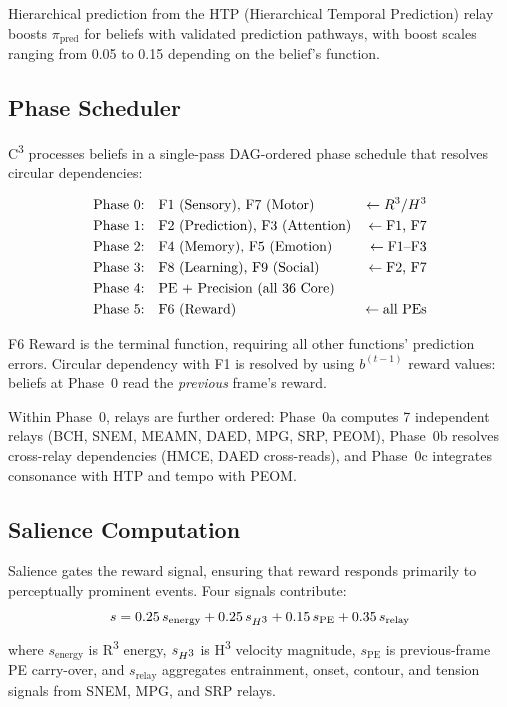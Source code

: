 \documentclass[10pt,twocolumn]{article}
\newcommand{\Rcube}{R\textsuperscript{3}}
\newcommand{\Hcube}{H\textsuperscript{3}}
\newcommand{\Ccube}{C\textsuperscript{3}}
\newcommand{\pe}{\mathrm{PE}}
\newcommand{\pipred}{\pi_{\mathrm{pred}}}
\begin{document}
Hierarchical prediction from the HTP (Hierarchical Temporal Prediction) relay boosts $\pipred$ for beliefs with validated prediction pathways, with boost scales ranging from 0.05 to 0.15 depending on the belief's function.

\subsection{Phase Scheduler}
\label{sec:scheduler}

\Ccube{} processes beliefs in a single-pass DAG-ordered phase schedule that resolves circular dependencies:

\begin{equation*}
\begin{aligned}
\text{Phase 0:} & \quad \text{F1 (Sensory), F7 (Motor)} &\leftarrow \Rcube/\Hcube \\
\text{Phase 1:} & \quad \text{F2 (Prediction), F3 (Attention)} &\leftarrow \text{F1, F7} \\
\text{Phase 2:} & \quad \text{F4 (Memory), F5 (Emotion)} &\leftarrow \text{F1--F3} \\
\text{Phase 3:} & \quad \text{F8 (Learning), F9 (Social)} &\leftarrow \text{F2, F7} \\
\text{Phase 4:} & \quad \text{PE + Precision (all 36 Core)} & \\
\text{Phase 5:} & \quad \text{F6 (Reward)} &\leftarrow \text{all PEs}
\end{aligned}
\end{equation*}

F6 Reward is the terminal function, requiring all other functions' prediction errors.
Circular dependency with F1 is resolved by using $b^{(t-1)}$ reward values: beliefs at Phase~0 read the \emph{previous} frame's reward.

Within Phase~0, relays are further ordered: Phase~0a computes 7 independent relays (BCH, SNEM, MEAMN, DAED, MPG, SRP, PEOM), Phase~0b resolves cross-relay dependencies (HMCE, DAED cross-reads), and Phase~0c integrates consonance with HTP and tempo with PEOM.

\subsection{Salience Computation}
\label{sec:salience}

Salience gates the reward signal, ensuring that reward responds primarily to perceptually prominent events.
Four signals contribute:
\begin{equation}
s = 0.25\,s_{\text{energy}} + 0.25\,s_{\Hcube} + 0.15\,s_{\pe} + 0.35\,s_{\text{relay}}
\label{eq:salience}
\end{equation}
where $s_{\text{energy}}$ is \Rcube{} energy, $s_{\Hcube}$ is \Hcube{} velocity magnitude, $s_{\pe}$ is previous-frame PE carry-over, and $s_{\text{relay}}$ aggregates entrainment, onset, contour, and tension signals from SNEM, MPG, and SRP relays.
\end{document}
